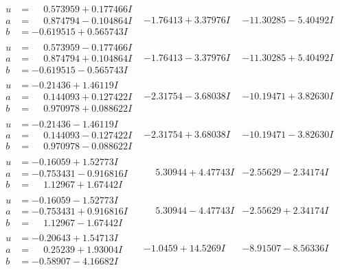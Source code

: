 \documentclass[1p]{elsarticle_modified}
\theoremstyle{definition}
\begin{document}
$$\begin{array}{c|c|c}
\begin{aligned}
u &= \phantom{-}0.573959 + 0.177466 I \\
a &= \phantom{-}0.874794 - 0.104864 I \\
b &= -0.619515 + 0.565743 I\end{aligned}
 & -1.76413 + 3.37976 I & -11.30285 - 5.40492 I \\ \hline\begin{aligned}
u &= \phantom{-}0.573959 - 0.177466 I \\
a &= \phantom{-}0.874794 + 0.104864 I \\
b &= -0.619515 - 0.565743 I\end{aligned}
 & -1.76413 - 3.37976 I & -11.30285 + 5.40492 I \\ \hline\begin{aligned}
u &= -0.21436 + 1.46119 I \\
a &= \phantom{-}0.144093 + 0.127422 I \\
b &= \phantom{-}0.970978 + 0.088622 I\end{aligned}
 & -2.31754 - 3.68038 I & -10.19471 + 3.82630 I \\ \hline\begin{aligned}
u &= -0.21436 - 1.46119 I \\
a &= \phantom{-}0.144093 - 0.127422 I \\
b &= \phantom{-}0.970978 - 0.088622 I\end{aligned}
 & -2.31754 + 3.68038 I & -10.19471 - 3.82630 I \\ \hline\begin{aligned}
u &= -0.16059 + 1.52773 I \\
a &= -0.753431 - 0.916816 I \\
b &= \phantom{-}1.12967 + 1.67442 I\end{aligned}
 & \phantom{-}5.30944 + 4.47743 I & -2.55629 - 2.34174 I \\ \hline\begin{aligned}
u &= -0.16059 - 1.52773 I \\
a &= -0.753431 + 0.916816 I \\
b &= \phantom{-}1.12967 - 1.67442 I\end{aligned}
 & \phantom{-}5.30944 - 4.47743 I & -2.55629 + 2.34174 I \\ \hline\begin{aligned}
u &= -0.20643 + 1.54713 I \\
a &= \phantom{-}0.25239 + 1.93004 I \\
b &= -0.58907 - 4.16682 I\end{aligned}
 & -1.0459 + 14.5269 I & -8.91507 - 8.56336 I \\ \hline\begin{aligned}

\end{aligned}
\end{array}$$
\end{document}
